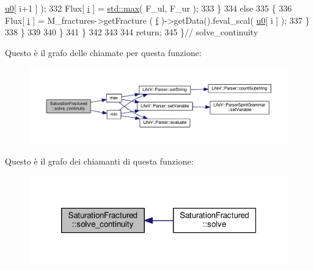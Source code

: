 \begin{DoxyCode}
      \hyperlink{god__e_8m_ae060ce5868d35ef17bcb6e832da03be9}{u0}[ i+1 ] );
332                     Flux[ \hyperlink{god__e_8m_a8604be5925f4266ab5ccc69675329c80}{i} ] = \hyperlink{UsefulFunctions_8h_a41a4284c74a9bcf6e35509f5eec72a55}{std::max}( F\_ul, F\_ur );
333                 \}
334                 \textcolor{keywordflow}{else}
335                 \{
336                     Flux[ \hyperlink{god__e_8m_a8604be5925f4266ab5ccc69675329c80}{i} ] = M\_fractures->getFracture ( \hyperlink{god__e_8m_a68f477f9b30a6300d5af9b02eac82f35}{f} )->getData().feval\_scal( 
      \hyperlink{god__e_8m_ae060ce5868d35ef17bcb6e832da03be9}{u0}[ i ] );
337                 \}
338             \}
339 
340         \}
341     \}
342 
343 
344     \textcolor{keywordflow}{return};
345 \}\textcolor{comment}{// solve\_continuity}
\end{DoxyCode}


Questo è il grafo delle chiamate per questa funzione\-:
\nopagebreak
\begin{figure}[H]
\begin{center}
\leavevmode
\includegraphics[width=350pt]{classSaturationFractured_ad7b71f3d032a3b9b52846c9277d706ec_cgraph}
\end{center}
\end{figure}




Questo è il grafo dei chiamanti di questa funzione\-:
\nopagebreak
\begin{figure}[H]
\begin{center}
\leavevmode
\includegraphics[width=320pt]{classSaturationFractured_ad7b71f3d032a3b9b52846c9277d706ec_icgraph}
\end{center}
\end{figure}



